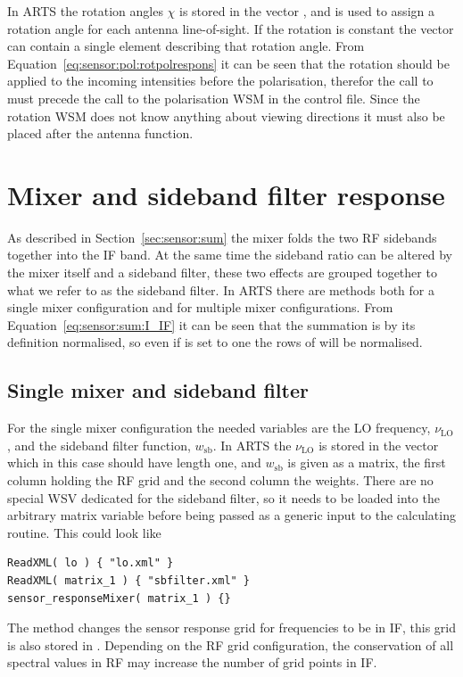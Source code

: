 In ARTS the rotation angles $\chi$ is stored in the vector , and is used to assign a rotation angle for each antenna line-of-sight. If the rotation is constant the  vector can contain a single element describing that rotation angle. From Equation~\ref{eq:sensor:pol:rotpolrespons} it can be seen that the rotation should be applied to the incoming intensities before the polarisation, therefor the call to  must precede the call to the polarisation WSM in the control file. Since the rotation WSM does not know anything about viewing directions it must also be placed after the antenna function. 


\section{Mixer and sideband filter response}
As described in Section~\ref{sec:sensor:sum} the mixer folds the two RF sidebands together into the IF band. At the same time the sideband ratio can be altered by the mixer itself and a sideband filter, these two effects are grouped together to what we refer to as the sideband filter. In ARTS there are methods both for a single mixer configuration and for multiple mixer configurations. From Equation~\ref{eq:sensor:sum:I_IF} it can be seen that the summation is by its definition normalised, so even if  is set to one the rows of  will be normalised.

\subsection{Single mixer and sideband filter}
For the single mixer configuration the needed variables are the LO frequency, $\nu_\mathrm{LO}$, and the sideband filter function, $w_\mathrm{sb}$. In ARTS the $\nu_\mathrm{LO}$ is stored in the vector  which in this case should have length one, and $w_\mathrm{sb}$ is given as a matrix, the first column holding the RF grid and the second column the weights. There are no special WSV dedicated for the sideband filter, so it needs to be loaded into the arbitrary matrix variable  before being passed as a generic input to the calculating routine. This could look like
\begin{verbatim}
ReadXML( lo ) { "lo.xml" }
ReadXML( matrix_1 ) { "sbfilter.xml" }
sensor_responseMixer( matrix_1 ) {}
\end{verbatim}
The method  changes the sensor response grid for frequencies to be in IF, this grid is also stored in . Depending on the RF grid configuration, the conservation of all spectral values in RF may increase the number of grid points in IF.

